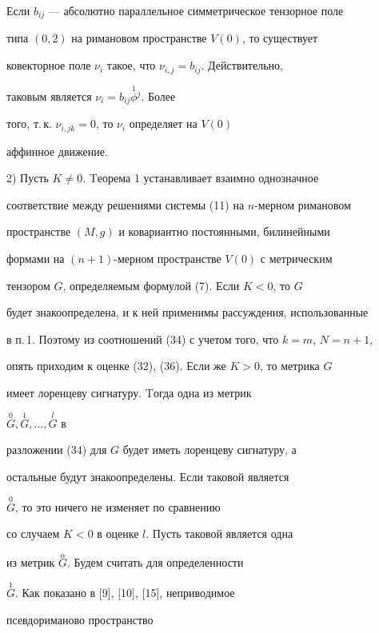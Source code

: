 \begin{note}


Если $b_{ij}$ --- абсолютно параллельное симметрическое тензорное поле 


типа $(0, 2)$ на римановом пространстве $V(0)$, то существует 


ковекторное поле $\nu_i$ такое, что $\nu_{i,j}= b_{ij}$. Действительно, 


таковым является $\nu_i = b_{ij} \overset{1} {\phi}{}^j$. Более 


того, т.\,к. $\nu_{i,jk} = 0$, то $\nu_i$ определяет на $V(0)$ 


аффинное движение.


\end{note}


 


2) Пусть $K\ne 0$. Tеорема 1 устанавливает взаимно однозначное 


соответствие между решениями системы (11) на $n$-мерном римановом 


пространстве $(M,g)$ и ковариантно постоянными, билинейными 


формами на $(n+1)$-мерном пространстве $V(0)$ с метрическим 


тензором $G$, определяемым формулой (7). Если $K<0$, то $G$ 


будет знакоопределена, и к ней применимы рассуждения, использованные 


в п.\,1. Поэтому из соотношений (34) с учетом того, что $k=m$, $N=n+1$,


опять приходим к оценке (32), (36). Если же $K>0$, то метрика $G$ 


имеет лоренцеву сигнатуру. Tогда одна из метрик


$\overset{0}{G}{}, \overset{1}{G}{},\dotsc,\overset{l}{G}$ в 


разложении (34) для $G$ будет иметь лоренцеву сигнатуру, а 


остальные будут знакоопределены. Если таковой является


$\overset{0}{G}$, то это ничего не изменяет по сравнению 


со случаем $K<0$ в оценке $l$. Пусть таковой является одна 


из метрик $\overset{\alpha}{G}$. Будем считать для определенности


$\overset{1}{G}$. Как показано в [9], [10], [15], неприводимое 


псевдориманово пространство



